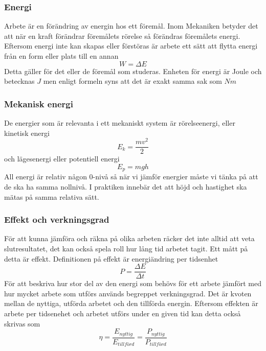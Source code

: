 \documentclass[11pt]{beamer}
\begin{document}
    \begin{frame}
        \frametitle{Energi}
        Arbete är en förändring av energin hos ett föremål. Inom Mekaniken betyder det att när en kraft förändrar
        föremålets rörelse så förändras föremålets energi. Eftersom energi inte kan skapas eller förstöras är arbete
        ett sätt att flytta energi från en form eller plats till en annan
        \begin{equation}
            W = \Delta E
        \end{equation}
        Detta gäller för det eller de föremål som studeras. Enheten för energi är Joule och betecknas $J$ men enligt
        formeln syns att det är exakt samma sak som $Nm$
    \end{frame}

    \begin{frame}
        \frametitle{Mekanisk energi}
        De energier som är relevanta i ett mekaniskt system är rörelseenergi, eller kinetisk energi
        \begin{equation}
            E_k = \frac{mv^2}{2}
        \end{equation}
        och lägesenergi eller potentiell energi
        \begin{equation}
            E_p = mgh
        \end{equation}
        All energi är relativ någon 0-nivå så när vi jämför energier måste vi tänka på att de ska ha samma nollnivå.
        I praktiken innebär det att höjd och hastighet ska mätas på samma relativa sätt.
    \end{frame}
    \begin{frame}
        \frametitle{Effekt och verkningsgrad}
        För att kunna jämföra och räkna på olika arbeten räcker det inte alltid att veta slutresultatet, det kan också
        spela roll hur lång tid arbetet tagit. Ett mått på detta är effekt. Definitionen på effekt är energiändring per tidsenhet
        \begin{equation}
            P = \frac{\Delta E}{\Delta t}
        \end{equation}
        För att beskriva hur stor del av den energi som behövs för ett arbete jämfört med hur mycket arbete som utförs
        används begreppet verkningsgrad.  Det är kvoten mellan de nyttiga, utförda arbetet och den tillförda energin.
        Eftersom effekten är arbete per tidsenehet och arbetet utförs under en given tid kan detta också skrivas som
        \begin{equation}
            \eta = \frac{E_{nyttig}}{E_{tillförd}} = \frac{P_{nyttig}}{P_{tillförd}}
        \end{equation}

    \end{frame}
\end{document}
